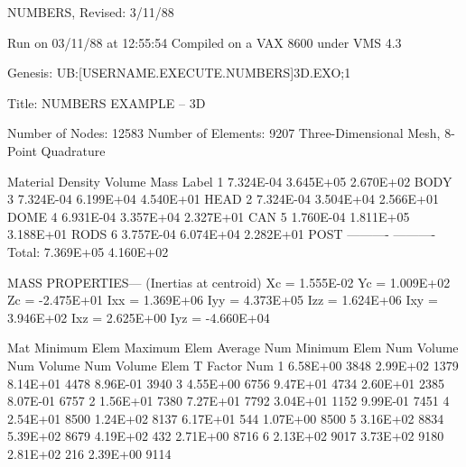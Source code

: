      NUMBERS, Revised:  3/11/88

     Run on 03/11/88 at 12:55:54
     Compiled on a VAX 8600 under VMS 4.3

     Genesis: UB:[USERNAME.EXECUTE.NUMBERS]3D.EXO;1

     Title:    NUMBERS EXAMPLE -- 3D

     Number of Nodes:     12583
     Number of Elements:   9207
     Three-Dimensional Mesh, 8-Point Quadrature

     Material    Density        Volume          Mass        Label
         1      7.324E-04      3.645E+05      2.670E+02     BODY
         3      7.324E-04      6.199E+04      4.540E+01     HEAD
         2      7.324E-04      3.504E+04      2.566E+01     DOME
         4      6.931E-04      3.357E+04      2.327E+01     CAN
         5      1.760E-04      1.811E+05      3.188E+01     RODS
         6      3.757E-04      6.074E+04      2.282E+01     POST
                              ----------     ----------
                  Total:       7.369E+05      4.160E+02

     MASS PROPERTIES--- (Inertias at centroid)
      Xc =  1.555E-02   Yc =  1.009E+02   Zc = -2.475E+01
     Ixx =  1.369E+06  Iyy =  4.373E+05  Izz =  1.624E+06
     Ixy =  3.946E+02  Ixz =  2.625E+00  Iyz = -4.660E+04

     Mat  Minimum   Elem   Maximum   Elem   Average   Num    Minimum   Elem
     Num   Volume   Num     Volume   Num     Volume   Elem   T Factor  Num
      1   6.58E+00  3848   2.99E+02  1379   8.14E+01  4478   8.96E-01  3940
      3   4.55E+00  6756   9.47E+01  4734   2.60E+01  2385   8.07E-01  6757
      2   1.56E+01  7380   7.27E+01  7792   3.04E+01  1152   9.99E-01  7451
      4   2.54E+01  8500   1.24E+02  8137   6.17E+01   544   1.07E+00  8500
      5   3.16E+02  8834   5.39E+02  8679   4.19E+02   432   2.71E+00  8716
      6   2.13E+02  9017   3.73E+02  9180   2.81E+02   216   2.39E+00  9114

